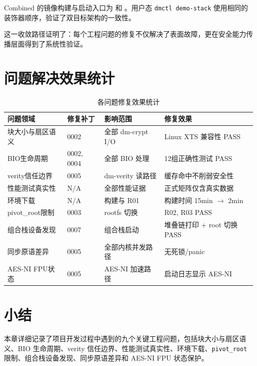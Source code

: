Combined 的镜像构建与启动入口为 \texttt{} 和 \texttt{}。用户态 \texttt{dmctl demo-stack} 使用相同的装饰器顺序，验证了双目标架构的一致性。

这一收敛路径证明了：每个工程问题的修复不仅解决了表面故障，更在安全能力传播层面得到了系统性验证。

\section{问题解决效果统计}

\begin{table}[H]
    \centering
    \caption{各问题修复效果统计}
    \begin{tabular}{p{}p{}p{}p{}}
        \toprule
        \textbf{问题领域} & \textbf{修复补丁} & \textbf{影响范围} & \textbf{修复效果} \\
        \midrule
        块大小与扇区语义 & 0002 & 全部 dm-crypt I/O & Linux XTS 兼容性 PASS \\
        BIO生命周期 & 0002, 0004 & 全部 BIO 处理 & 12组正确性测试 PASS \\
        verity信任边界 & 0005 & dm-verity 读路径 & 缓存命中不削弱安全性 \\
        性能测试真实性 & N/A & 全部性能证据 & 正式矩阵仅含真实数据 \\
        环境下载 & N/A & 构建与 R01 & 构建时间 15min $\to$ 2min \\
        pivot\_root限制 & 0003 & rootfs 切换 & R02, R03 PASS \\
        组合栈设备发现 & 0007 & 组合栈启动 & 堆叠链打印 + root 切换 PASS \\
        同步原语差异 & 0005 & 全部内核并发路径 & 无死锁/panic \\
        AES-NI FPU状态 & 0005 & AES-NI 加速路径 & 启动日志显示 AES-NI \\
        \bottomrule
    \end{tabular}
\end{table}

\section{小结}

本章详细记录了项目开发过程中遇到的九个关键工程问题，包括块大小与扇区语义、BIO 生命周期、verity 信任边界、性能测试真实性、环境下载、\texttt{pivot\_root} 限制、组合栈设备发现、同步原语差异和 AES-NI FPU 状态保护。

